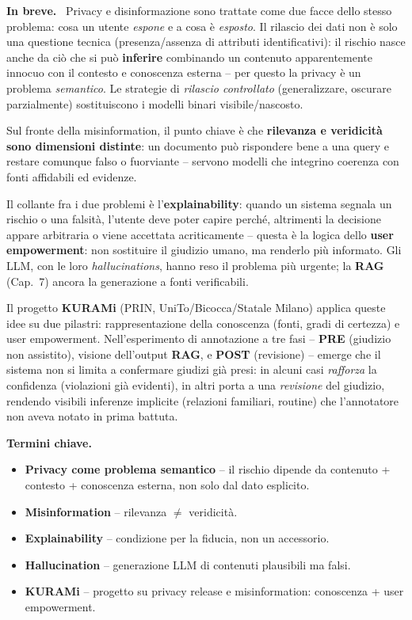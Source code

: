 \documentclass[11pt,a4paper]{article}
\newcommand{\spiega}{\medskip\noindent\textbf{\textcolor{blue!45!black}{In breve.}}\ }
\newcommand{\termini}{\medskip\noindent\textbf{\textcolor{blue!45!black}{Termini chiave.}}}
\begin{document}
\spiega
Privacy e disinformazione sono trattate come due facce dello stesso problema: cosa un utente \emph{espone} e a cosa \`e \emph{esposto}. Il rilascio dei dati non \`e solo una questione tecnica (presenza/assenza di attributi identificativi): il rischio nasce anche da ci\`o che si pu\`o \textbf{inferire} combinando un contenuto apparentemente innocuo con il contesto e conoscenza esterna -- per questo la privacy \`e un problema \emph{semantico}. Le strategie di \emph{rilascio controllato} (generalizzare, oscurare parzialmente) sostituiscono i modelli binari visibile/nascosto.

Sul fronte della misinformation, il punto chiave \`e che \textbf{rilevanza e veridicit\`a sono dimensioni distinte}: un documento pu\`o rispondere bene a una query e restare comunque falso o fuorviante -- servono modelli che integrino coerenza con fonti affidabili ed evidenze.

Il collante fra i due problemi \`e l'\textbf{explainability}: quando un sistema segnala un rischio o una falsit\`a, l'utente deve poter capire perch\'e, altrimenti la decisione appare arbitraria o viene accettata acriticamente -- questa \`e la logica dello \textbf{user empowerment}: non sostituire il giudizio umano, ma renderlo pi\`u informato. Gli LLM, con le loro \emph{hallucinations}, hanno reso il problema pi\`u urgente; la \textbf{RAG} (Cap.~7) ancora la generazione a fonti verificabili.

Il progetto \textbf{KURAMi} (PRIN, UniTo/Bicocca/Statale Milano) applica queste idee su due pilastri: rappresentazione della conoscenza (fonti, gradi di certezza) e user empowerment. Nell'esperimento di annotazione a tre fasi -- \textbf{PRE} (giudizio non assistito), visione dell'output \textbf{RAG}, e \textbf{POST} (revisione) -- emerge che il sistema non si limita a confermare giudizi gi\`a presi: in alcuni casi \emph{rafforza} la confidenza (violazioni gi\`a evidenti), in altri porta a una \emph{revisione} del giudizio, rendendo visibili inferenze implicite (relazioni familiari, routine) che l'annotatore non aveva notato in prima battuta.

\termini
\begin{itemize}
\item \textbf{Privacy come problema semantico} -- il rischio dipende da contenuto + contesto + conoscenza esterna, non solo dal dato esplicito.
\item \textbf{Misinformation} -- rilevanza $\ne$ veridicit\`a.
\item \textbf{Explainability} -- condizione per la fiducia, non un accessorio.
\item \textbf{Hallucination} -- generazione LLM di contenuti plausibili ma falsi.
\item \textbf{KURAMi} -- progetto su privacy release e misinformation: conoscenza + user empowerment.
\end{itemize}
\end{document}
